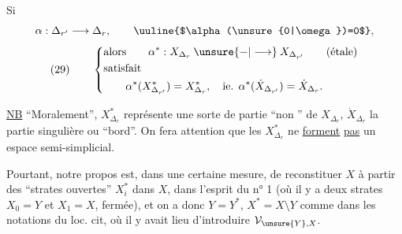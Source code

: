 Si
\[
\alpha:\Delta_{r'}\longrightarrow\Delta_r,\qquad \text{\uuline{$\alpha(\unsure{0|\omega})=0$}},
\]
\[
(29)\qquad\left\{\begin{aligned}
&\text{alors}\qquad \alpha^*:X_{\Delta_r}\mathbin{\unsure{-|\longrightarrow}}X_{\Delta_{r'}}\qquad(\text{étale})\\
&\text{satisfait}\\
&\qquad\alpha^*(X_{\Delta_{r'}}^*)=X_{\Delta_r}^*,\quad\text{ie. }\alpha^*(\dot X_{\Delta_{r'}})=\dot X_{\Delta_r}.
\end{aligned}\right.
\]


\uline{NB} ``Moralement'', $X_{\Delta_r}^*$ représente une sorte de partie ``non '' de $X_{\Delta_r}$, $\dot X_{\Delta_r}$ la partie singulière ou ``bord''. On fera attention que les $X_{\Delta_r}^*$ ne \uline{forment} \uline{pas} un espace semi-simplicial.

Pourtant, notre propos est, dans une certaine mesure, de reconstituer $X$ à partir des ``strates ouvertes'' $X_i^*$ dans $X$, dans l'esprit du n° 1 (où il y a deux strates $X_0=Y$ et $X_1=X$,   fermée), et on a donc $Y=Y^*$, $X^*=X\setminus Y$ comme dans les notations du loc. cit, où il y avait lieu d'introduire $\mathcal{V}_{\unsure{Y},X}$.
